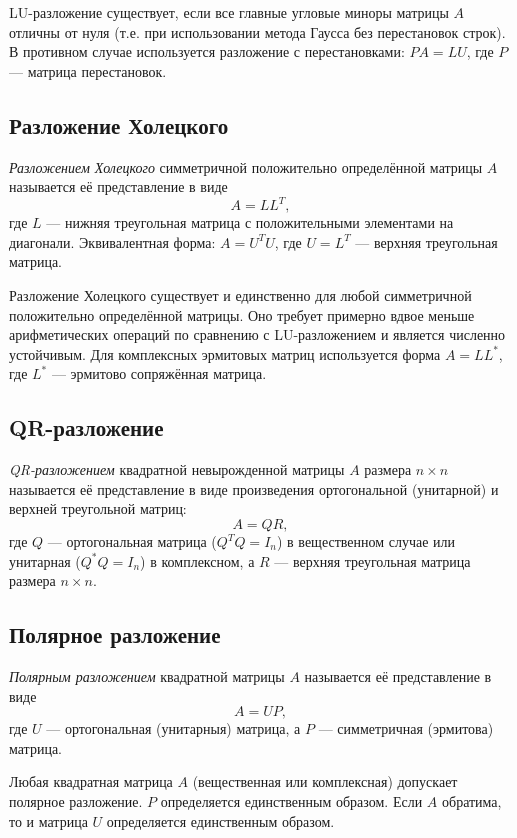 \documentclass[10pt]{article}
\begin{document}
\begin{remark}
    LU-разложение существует, если все главные угловые миноры матрицы $A$ отличны от нуля (т.е. при использовании метода Гаусса без перестановок строк). В противном случае используется разложение с перестановками: $PA = LU$, где $P$ — матрица перестановок.
\end{remark}

\subsection{Разложение Холецкого}
\begin{definition}
    \textit{Разложением Холецкого} симметричной положительно определённой матрицы $A$ называется её представление в виде
    \[
    A = LL^T,
    \]
    где $L$ — нижняя треугольная матрица с положительными элементами на диагонали. Эквивалентная форма: $A = U^TU$, где $U = L^T$ — верхняя треугольная матрица.
\end{definition}

\begin{remark}
    Разложение Холецкого существует и единственно для любой симметричной положительно определённой матрицы. Оно требует примерно вдвое меньше арифметических операций по сравнению с LU-разложением и является численно устойчивым. Для комплексных эрмитовых матриц используется форма $A = LL^*$, где $L^*$ — эрмитово сопряжённая матрица.
\end{remark}

\subsection{QR-разложение}
\begin{definition}
    \textit{QR-разложением} квадратной невырожденной матрицы $A$ размера $n\times n$ называется её представление в виде произведения ортогональной (унитарной) и верхней треугольной матриц:
    \[
    A = QR,
    \]
    где $Q$ — ортогональная матрица ($Q^T Q = I_n$) в вещественном случае или унитарная ($Q^* Q = I_n$) в комплексном, а $R$ — верхняя треугольная матрица размера $n\times n$.
\end{definition}

\subsection{Полярное разложение}
\begin{definition}
    \textit{Полярным разложением} квадратной матрицы $A$ называется её представление в виде
    \[
    A = UP,
    \]
    где $U$ — ортогональная (унитарныя) матрица, а $P$ — симметричная (эрмитова) матрица.
\end{definition}

\begin{theorem}[Существование]
    Любая квадратная матрица $A$ (вещественная или комплексная) допускает полярное разложение. $P$ определяется единственным образом. Если $A$ обратима, то и матрица $U$ определяется единственным образом.
\end{theorem}
\end{document}
